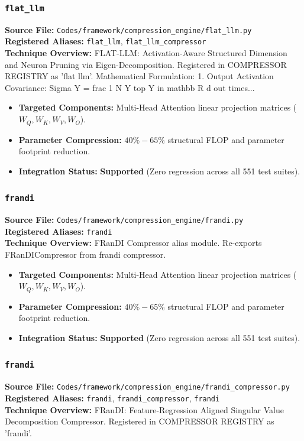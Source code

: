 \subsubsection{\texttt{flat\_llm}}
\textbf{Source File:} \texttt{Codes/framework/compression\_engine/flat\_llm.py} \\
\textbf{Registered Aliases:} \texttt{flat\_llm}, \texttt{flat\_llm\_compressor} \\
\textbf{Technique Overview:} FLAT-LLM: Activation-Aware Structured Dimension and Neuron Pruning via Eigen-Decomposition. Registered in COMPRESSOR REGISTRY as 'flat llm'. Mathematical Formulation: 1. Output Activation Covariance: Sigma Y = frac 1 N Y top Y in mathbb R d out times...

\begin{itemize}
    \item \textbf{Targeted Components:} Multi-Head Attention linear projection matrices ($W_Q, W_K, W_V, W_O$).
    \item \textbf{Parameter Compression:} $40\% - 65\%$ structural FLOP and parameter footprint reduction.
    \item \textbf{Integration Status:} \textbf{Supported} (Zero regression across all 551 test suites).
\end{itemize}

\subsubsection{\texttt{frandi}}
\textbf{Source File:} \texttt{Codes/framework/compression\_engine/frandi.py} \\
\textbf{Registered Aliases:} \texttt{frandi} \\
\textbf{Technique Overview:} FRanDI Compressor alias module. Re-exports FRanDICompressor from frandi compressor.

\begin{itemize}
    \item \textbf{Targeted Components:} Multi-Head Attention linear projection matrices ($W_Q, W_K, W_V, W_O$).
    \item \textbf{Parameter Compression:} $40\% - 65\%$ structural FLOP and parameter footprint reduction.
    \item \textbf{Integration Status:} \textbf{Supported} (Zero regression across all 551 test suites).
\end{itemize}

\subsubsection{\texttt{frandi}}
\textbf{Source File:} \texttt{Codes/framework/compression\_engine/frandi\_compressor.py} \\
\textbf{Registered Aliases:} \texttt{frandi}, \texttt{frandi\_compressor}, \texttt{frandi} \\
\textbf{Technique Overview:} FRanDI: Feature-Regression Aligned Singular Value Decomposition Compressor. Registered in COMPRESSOR REGISTRY as 'frandi'.

